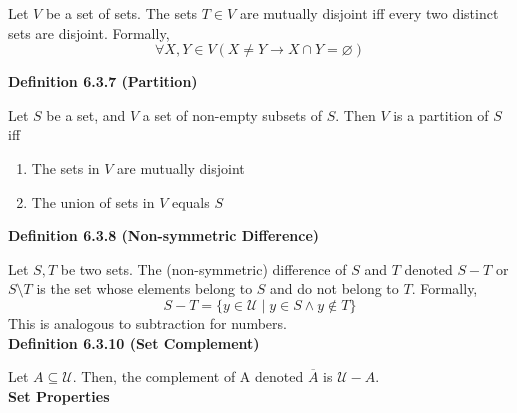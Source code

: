 \documentclass[a4paper]{article}
\newcommand{\subheading}[1]{{\scriptsize\textbf{#1}}}
\begin{document}
\begin{multicols*}{4}
Let $V$ be a set of sets. The sets $T \in V$ are mutually disjoint iff every two
distinct sets are disjoint. Formally,
$$\forall X, Y \in V (X \neq Y \rightarrow X \cap Y = \varnothing)$$

\subheading{Definition 6.3.7 (Partition)}

Let $S$ be a set, and $V$ a set of non-empty subsets of $S$. Then $V$ is a
partition of $S$ iff
\begin{enumerate} \itemsep -0.5em
	\item The sets in $V$ are mutually disjoint
	\item The union of sets in $V$ equals $S$
\end{enumerate}

\subheading{Definition 6.3.8 (Non-symmetric Difference)}

Let $S, T$ be two sets. The (non-symmetric) difference of $S$ and $T$ denoted
$S-T$ or $S\setminus T$ is the set whose elements belong to $S$ and do not
belong to $T$. Formally,
$$S - T = \{y \in \mathcal{U}\;|\;y \in S \land y \not\in T \}$$
This is analogous to subtraction for numbers.\\

\subheading{Definition 6.3.10 (Set Complement)}

Let $A \subseteq \mathcal{U}$. Then, the complement of A denoted $\overline{A}$ is
$\mathcal{U}-A$.\\

\subheading{Set Properties}


\end{multicols*}
\end{document}
